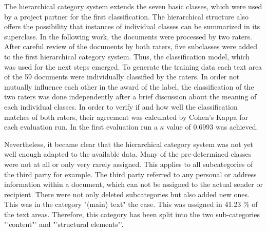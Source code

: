 The hierarchical category system extends the seven basic classes, which were used by a project partner for the first classification. The hierarchical structure also offers the possibility that instances of individual classes can be summarized in its superclass. In the following work, the documents were processed by two raters. After careful review of the documents by both raters, five subclasses were added to the first hierarchical category system. Thus, the classification model, which was used for the next steps emerged. To generate the training data each text area of the 59 documents were individually classified by the raters. In order not mutually influence each other in the award of the label, the classification of the two raters was done  independently after a brief discussion about the meaning of each individual classes. In order to verify if and how well the classification matches of both raters, their agreement was calculated by Cohen's Kappa for each evaluation run. In the first evaluation run a $\kappa$ value of 0.6993 was achieved.


Nevertheless, it became clear that the hierarchical category system was not yet well enough adapted to the available data. Many of the pre-determined classes were not at all or only very rarely assigned. This applies to all subcategories of the third party for example. The third party referred to any personal or address information within a document, which can not be assigned to the actual sender or recipient. There were not only deleted subcategories but also added new ones. This was in the category "(main) text" the case. This was assigned in 41.23 \% of the text areas. Therefore, this category has been split into the two  sub-categories "'content"' and "'structural elements"'.

